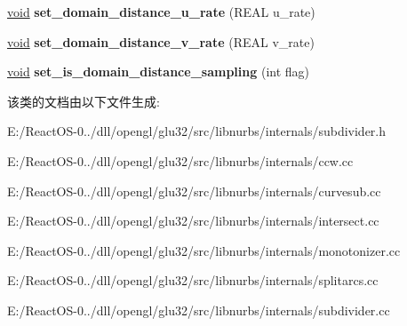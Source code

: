 \begin{DoxyCompactItemize}
\item 
\mbox{\label{class_subdivider_a32e6e50b69c09ad0b92fa23f251b4df1}} 
\hyperlink{interfacevoid}{void} {\bfseries set\+\_\+domain\+\_\+distance\+\_\+u\+\_\+rate} (R\+E\+AL u\+\_\+rate)
\item 
\mbox{\label{class_subdivider_a84f6bb569fd72aebdc1bc7ccb33488b5}} 
\hyperlink{interfacevoid}{void} {\bfseries set\+\_\+domain\+\_\+distance\+\_\+v\+\_\+rate} (R\+E\+AL v\+\_\+rate)
\item 
\mbox{\label{class_subdivider_a3a21f4165ae27448e6ecfa2bb5228a9b}} 
\hyperlink{interfacevoid}{void} {\bfseries set\+\_\+is\+\_\+domain\+\_\+distance\+\_\+sampling} (int flag)
\end{DoxyCompactItemize}


该类的文档由以下文件生成\+:\begin{DoxyCompactItemize}
\item 
E\+:/\+React\+O\+S-\/0../dll/opengl/glu32/src/libnurbs/internals/subdivider.\+h\item 
E\+:/\+React\+O\+S-\/0../dll/opengl/glu32/src/libnurbs/internals/ccw.\+cc\item 
E\+:/\+React\+O\+S-\/0../dll/opengl/glu32/src/libnurbs/internals/curvesub.\+cc\item 
E\+:/\+React\+O\+S-\/0../dll/opengl/glu32/src/libnurbs/internals/intersect.\+cc\item 
E\+:/\+React\+O\+S-\/0../dll/opengl/glu32/src/libnurbs/internals/monotonizer.\+cc\item 
E\+:/\+React\+O\+S-\/0../dll/opengl/glu32/src/libnurbs/internals/splitarcs.\+cc\item 
E\+:/\+React\+O\+S-\/0../dll/opengl/glu32/src/libnurbs/internals/subdivider.\+cc\end{DoxyCompactItemize}
